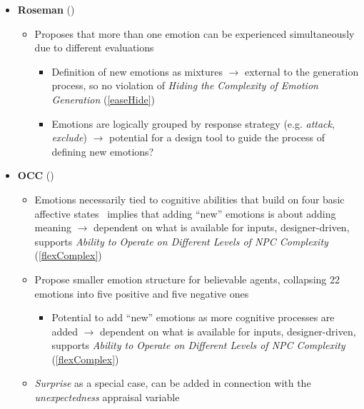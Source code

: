 \begin{itemize}
    \item \textbf{Roseman} (\good)
    \begin{itemize}
        \item Proposes that more than one emotion can be experienced
        simultaneously due to different
        evaluations~\citep[p.~81]{roseman2001model}
        \begin{itemize}
            \item Definition of new emotions as mixtures $\rightarrow$ external
            to the generation process, so no violation of \textit{Hiding the
                Complexity of Emotion Generation} (\ref{easeHide})

            \item Emotions are logically grouped by response strategy (e.g.
            \textit{attack}, \textit{exclude}) $\rightarrow$ potential for a
            design tool to guide the process of defining new emotions?
        \end{itemize}
    \end{itemize}

    \item \textbf{OCC} (\good)
    \begin{itemize}
        \item Emotions necessarily tied to cognitive abilities that build on
        four basic affective states~\citep[p.~183--184]{ortony2005affect}
        implies that adding ``new'' emotions is about adding meaning
        $\rightarrow$ dependent on what is available for inputs,
        designer-driven, supports \textit{Ability to Operate on Different
            Levels of NPC Complexity} (\ref{flexComplex})

        \item Propose smaller emotion structure for believable agents,
        collapsing 22 emotions into five positive and five negative
        ones~\citep[p.~193--194]{ortony2002making}
        \begin{itemize}
            \item Potential to add ``new'' emotions as more cognitive processes
            are added $\rightarrow$ dependent on what is available for inputs,
            designer-driven, supports \textit{Ability to Operate on Different
                Levels of NPC Complexity} (\ref{flexComplex})
        \end{itemize}

        \item \textit{Surprise} as a special case, can be added in connection
        with the \textit{unexpectedness} appraisal variable~\citep[p.~13--14,
        16--17]{ortony2021all}


\end{itemize}
\end{itemize}

